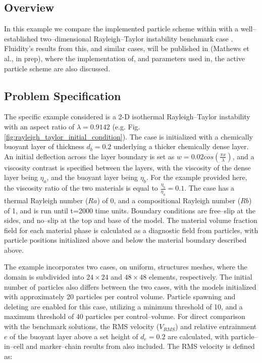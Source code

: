 \subsection{Overview}

In this example we compare the implemented particle scheme within \fluidity{} with a well--established two--dimensional Rayleigh--Taylor instability benchmark case \citep{vankeken1997comparison}. Fluidity's results from this, and similar cases, will be published in (Mathews et al., in prep), where the implementation of, and parameters used in, the active particle scheme are also discussed.


\subsection{Problem Specification}

The specific example considered is a 2-D isothermal Rayleigh--Taylor instability with an aspect ratio of $\lambda = 0.9142$ (e.g. Fig. \ref{fig:rayleigh_taylor_initial_condition}). The case is initialized with a chemically buoyant layer of thickness $d_b = 0.2$ underlying a thicker chemically dense layer. An initial deflection across the layer boundary is set as $w = 0.02cos(\frac{\pi x}{\lambda})$, and a viscosity contrast is specified between the layers, with the viscosity of the dense layer being $\eta_a$, and the buoyant layer being $\eta_b$. For the example provided here, the viscosity ratio of the two materials is equal to $\frac{\eta_b}{\eta_a}=0.1$. The case has a thermal Rayleigh number ($Ra$) of 0, and a compositional Rayleigh number ($Rb$) of 1, and is run until t=2000 time units. Boundary conditions are free--slip at the sides, and no--slip at the top and base of the model. The material volume fraction field for each material phase is calculated as a diagnostic field from particles, with particle positions initialized above and below the material boundary described above.

The example incorporates two cases, on uniform, structures meshes, where the domain is subdivided into $24 \times 24$ and $48 \times 48$ elements, respectively. The initial number of particles also differs between the two cases, with the models initialized with approximately 20 particles per control volume. Particle spawning and deleting are enabled for this case, utilizing a minimum threshold of 10, and a maximum threshold of 40 particles per control--volume. For direct comparison with the benchmark solutions, the RMS velocity ($V_{RMS}$) and relative entrainment $e$ of the buoyant layer above a set height of $d_e = 0.2$ are calculated, with particle--in--cell and marker--chain results from \citet{vankeken1997comparison} also included. The RMS velocity is defined as:

